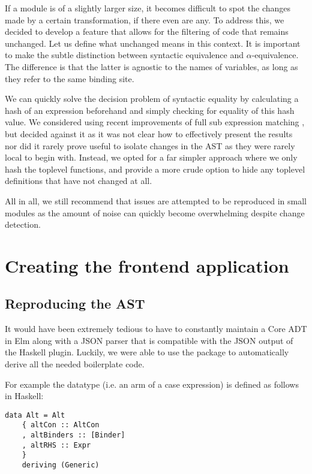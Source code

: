 If a module is of a slightly larger size, it becomes difficult to spot the changes made by a certain
transformation, if there even are any. To address this, we decided to develop a feature that allows for
the filtering of code that remains unchanged. Let us define what unchanged means in this context. It is
important to make the subtle distinction between syntactic equivalence and $\alpha$-equivalence. The difference
is that the latter is agnostic to the names of variables, as long as they refer to the same binding site.

We can quickly solve the decision problem of syntactic equality by calculating a hash of an expression beforehand
and simply checking for equality of this hash value. We considered using recent improvements of full sub expression
matching \cite{hashing_mod_alpha}, but decided against it as it was not clear how to effectively present the results
nor did it rarely prove useful to isolate changes in the AST as they were rarely local to begin with.
Instead, we opted for a far simpler approach where we only hash the toplevel functions, and provide a more crude
option to hide any toplevel definitions that have not changed at all.

All in all, we still recommend that issues are attempted to be reproduced in small modules as the amount of
noise can quickly become overwhelming despite change detection.

\section{Creating the frontend application}

\subsection{Reproducing the AST}
It would have been extremely tedious to have to constantly maintain a Core ADT in Elm along with a JSON
parser that is compatible with the JSON output of the Haskell plugin. Luckily, we were able to use the
 \cite{haskell_to_elm} package to automatically derive all the needed boilerplate code.

For example the  datatype (i.e. an arm of a case expression) is defined as follows in Haskell:

\begin{listing}[H]
\begin{verbatim}
data Alt = Alt
    { altCon :: AltCon
    , altBinders :: [Binder]
    , altRHS :: Expr
    }
    deriving (Generic)
\end{verbatim}
\end{listing}

